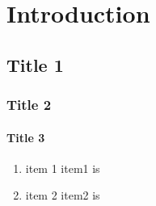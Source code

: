 \chapter{Introduction}\label{ch:intro}


\section{Title 1}\label{sec:introch1}

\subsection{Title 2}

\subsubsection{Title 3}

\begin{enumerate}
	\item item 1 \textemdash item1 is
	\item item 2 \textemdash item2 is
\end{enumerate}

\cite{teeuw1959history}
